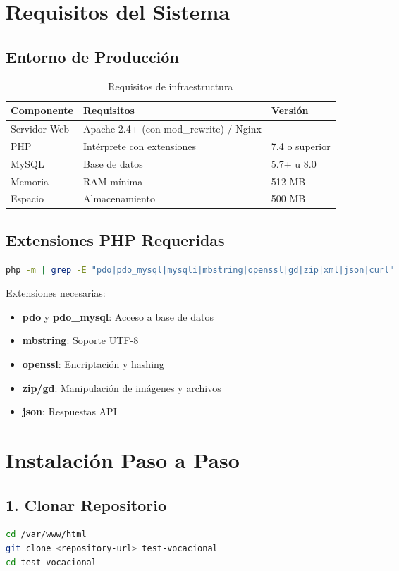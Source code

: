 \documentclass[12pt, a4paper]{report}
\begin{document}
\section{Requisitos del Sistema}

\subsection{Entorno de Producción}
\begin{table}[H]
\centering
\begin{tabularx}{\textwidth}{|l|X|l|}
\hline
\textbf{Componente} & \textbf{Requisitos} & \textbf{Versión} \\
\hline
Servidor Web & Apache 2.4+ (con mod\_rewrite) / Nginx & - \\
PHP & Intérprete con extensiones & 7.4 o superior \\
MySQL & Base de datos & 5.7+ u 8.0 \\
Memoria & RAM mínima & 512 MB \\
Espacio & Almacenamiento & 500 MB \\
\hline
\end{tabularx}
\caption{Requisitos de infraestructura}
\end{table}

\subsection{Extensiones PHP Requeridas}
\begin{lstlisting}[language=Bash]
php -m | grep -E "pdo|pdo_mysql|mysqli|mbstring|openssl|gd|zip|xml|json|curl"
\end{lstlisting}
Extensiones necesarias:
\begin{itemize}
    \item \textbf{pdo} y \textbf{pdo\_mysql}: Acceso a base de datos
    \item \textbf{mbstring}: Soporte UTF-8
    \item \textbf{openssl}: Encriptación y hashing
    \item \textbf{zip/gd}: Manipulación de imágenes y archivos
    \item \textbf{json}: Respuestas API
\end{itemize}

\section{Instalación Paso a Paso}

\subsection{1. Clonar Repositorio}
\begin{lstlisting}[language=Bash]
cd /var/www/html
git clone <repository-url> test-vocacional
cd test-vocacional
\end{lstlisting}
\end{document}
